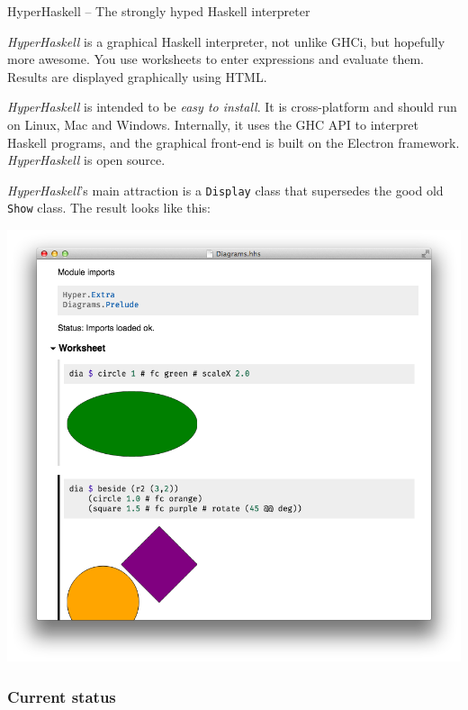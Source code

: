 \begin{hcarentry}[updated]{HyperHaskell -- The strongly hyped Haskell interpreter}
\label{hyper-haskell}
\makeheader

\emph{HyperHaskell} is a graphical Haskell interpreter, not unlike GHCi, but
hopefully more awesome. You use worksheets to enter expressions and evaluate
them. Results are displayed graphically using HTML.

\emph{HyperHaskell} is intended to be \emph{easy to install}. It is
cross-platform and should run on Linux, Mac and Windows. Internally, it uses
the GHC API to interpret Haskell programs, and the graphical front-end is
built on the Electron framework. \emph{HyperHaskell} is open source.

\emph{HyperHaskell}'s main attraction is a \verb`Display` class that
supersedes the good old \verb`Show` class. The result looks like this:

\begin{center}
  \includegraphics[width=\columnwidth]{html/worksheet-diagrams.png}
\end{center}

\subsubsection*{Current status}


\end{hcarentry}
